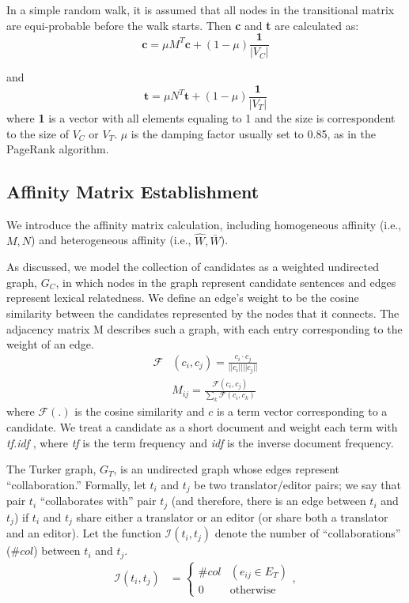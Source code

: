 \documentclass[11pt]{article}
\begin{document}
In a simple random walk, it is assumed that all nodes in the transitional matrix are equi-probable before the walk starts. Then \textbf{c} and \textbf{t} are calculated as:
\begin{equation}
\textbf{c}=\mu M^{T}\textbf{c} + (1-\mu) \frac{\textbf{1}}{|V_C|}
\end{equation}

and
\begin{equation}
\textbf{t}=\mu N^{T}\textbf{t} + (1-\mu) \frac{\textbf{1}}{|V_T|}
\end{equation} where \textbf{1} is a vector with all elements equaling to 1 and the size is correspondent to the size of $V_C$ or $V_T$. $\mu$ is the damping factor usually set to 0.85, as in the PageRank algorithm.

\subsection{Affinity Matrix Establishment}
\label{affinity}
We introduce the affinity matrix calculation, including homogeneous affinity (i.e., ${M},{N}$) and heterogeneous affinity (i.e., $\hat{W},\bar{W}$).

As discussed, we model the collection of candidates as a weighted undirected graph, $G_C$, in which nodes in the graph represent candidate sentences and edges represent lexical relatedness. We define an edge's weight to be the cosine similarity between the candidates represented by the nodes that it connects. The adjacency matrix M describes such a graph, with each entry corresponding to the weight of an edge.
\begin{equation}
\begin{aligned}
\mathcal{F}&(c_i,c_j)=\frac{c_i \cdot c_j}{||c_i||||c_j||}\\
&M_{ij}=\frac{\mathcal{F}(c_i,c_j)}{\sum_k \mathcal{F}(c_i,c_k)}
\end{aligned}
\end{equation} where $\mathcal{F}(.)$ is the cosine similarity and $c$ is a term vector corresponding to a candidate. We treat a candidate as a short document and weight each term with \textit{tf.idf} \cite{a16}, where \textit{tf} is the term frequency and \textit{idf} is the inverse document frequency.

The Turker graph, $G_T$, is an undirected graph whose edges represent ``collaboration.'' Formally, let $t_i$ and $t_j$ be two translator/editor pairs; we say that pair $t_i$ ``collaborates with'' pair $t_j$ (and therefore, there is an edge between $t_i$ and $t_j$) if $t_i$ and $t_j$ share either a translator or an editor (or share both a translator and an editor). Let the function $\mathcal{I}(t_i,t_j)$ denote the number of ``collaborations'' ($\#col$) between $t_i$ and $t_j$.
\begin{equation}
\begin{aligned}
\mathcal{I}(t_i,t_j)&=
\begin{cases}
\#col &(e_{ij} \in E_T) \\
0 &\text{otherwise}
\end{cases}, \\
\end{aligned}
\end{equation}
\end{document}
